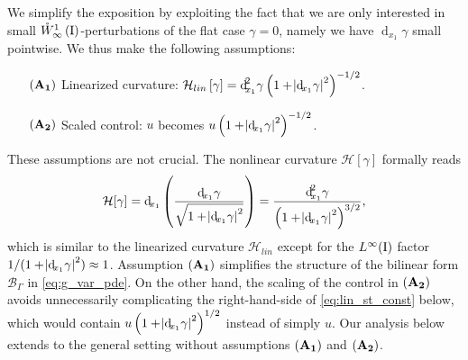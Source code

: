 \documentclass[final]{siamltex}
\begin{document}
We simplify the exposition by exploiting the fact that we are only interested in small ${{\mathring{W}^{1}_{\infty}\del{{\text{\rm I}}}}}$-perturbations 
of the flat case $\gamma=0$, namely we have
${\operatorname{d}\!}_{x_1}\gamma$ small pointwise. We thus make the following assumptions:
\begin{itemize}
 \item[{$\bf (A_1)$}] Linearized curvature: $\mathcal{H}_{lin}\sbr{\gamma} = {{\operatorname{d}\!}^2_{x_1}\gamma} \del{1+\abs{{\operatorname{d}\!}_{x_1}\gamma}^2}^{-1/2}$.
 \item[{$\bf (A_2)$}] Scaled control: $u$ becomes $u \del{1+\abs{{\operatorname{d}\!}_{x_1}\gamma}^2}^{-1/2}$. 
\end{itemize}
These assumptions are not crucial. 
The nonlinear curvature $\mathcal{H}[\gamma]$ formally reads
\[
    \mathcal{H}[\gamma] = {\operatorname{d}\!}_{x_1}\del{\frac{{\operatorname{d}\!}_{x_1}\gamma}{\sqrt{1+\abs{{\operatorname{d}\!}_{x_1}\gamma}^2}}}  
        = \frac{{\operatorname{d}\!}_{x_1}^2 \gamma}{ \del{ 1+\abs{{\operatorname{d}\!}_{x_1}\gamma}^2}^{3/2}} ,
\]
which is similar to the linearized curvature $\mathcal{H}_{lin}$ except for the $L^\infty({\text{\rm I}})$ 
factor $1/(1+\abs{{\operatorname{d}\!}_{x_1} \gamma}^2) \approx 1$. Assumption ${\bf (A_1)}$ simplifies the structure of the bilinear form ${{\mathcal{B}}_\Gamma}$ in \eqref{eq:g_var_pde}. On the other hand, the scaling of the control in ${\bf (A_2)}$ avoids unnecessarily complicating the right-hand-side of \eqref{eq:lin_st_const} below, which would contain $u \del{1+\abs{{\operatorname{d}\!}_{x_1}\gamma}^2}^{1/2}$ instead of simply $u$. Our analysis below extends to the general setting without assumptions ${\bf (A_1)}$ and ${\bf (A_2)}$.
\end{document}
